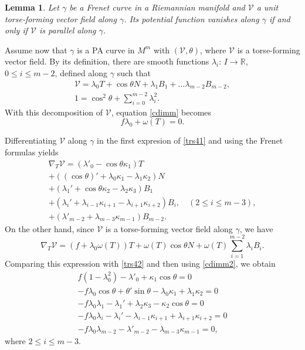 \documentclass[10pt,a4paper]{amsart}
\newtheorem{lemma}{Lemma}
\def\r{\mathbb R}
\def\v{\mathcal V}
\begin{document}
\begin{lemma}\label{consleng}
Let $\gamma $ be a Frenet curve in a Riemannian manifold and $\v$ a unit torse-forming vector field along $\gamma$. Its potential function vanishes along $\gamma$ if and only if $\v$ is parallel along $\gamma$.
\end{lemma}

Assume now that $\gamma$ is a PA curve in $M^m$ with $(\v,\theta)$, where $\v$ is a torse-forming vector field. By its definition, there are smooth functions $\lambda_i:\,I\to \r$, $0\leq i \leq m-2$, defined along $\gamma$ such that
\begin{equation}
\left. 
\begin{array}{l}
\v=\lambda_0 T+\cos\theta N+\lambda_1 B_1+\ldots \lambda_{m-2}B_{m-2}, \\ 
1=\cos^2\theta+\sum_{i=0}^{m-2}\lambda_i^2.
\end{array}%
\right. \label{trs41}
\end{equation}
With this decomposition of $\v$, equation \eqref{cdimm} becomes
\begin{equation}
f\lambda_0+\omega(T)=0. \label{cdimm2}
\end{equation}

Differentiating $\v$ along $\gamma$ in the first expresion of \eqref{trs41} and using the Frenet formulas yields
\begin{equation}
\left. 
\begin{array}{l}
\nabla_T\v= (\lambda'_0-\cos\theta \kappa_1)T\\
+((\cos \theta)'+\lambda_0\kappa_1-\lambda_1\kappa_2)N \\
+(\lambda_1'+\cos\theta\kappa_2-\lambda_2\kappa_3)B_1\\
+(\lambda_i'+\lambda_{i-1}\kappa_{i+1}-\lambda_{i+1}\kappa_{i+2})B_i, \quad (2\leq i \leq m-3),\\
+(\lambda'_{m-2}+\lambda_{m-3}\kappa_{m-1})B_{m-2} .
\end{array}%
\right. \label{trs42}
\end{equation}
On the other hand, since $\v$ is a torse-forming vector field along $\gamma$, we have
$$
\nabla_T\v=(f+\lambda_0\omega(T))T+\omega(T)\cos\theta N+\omega(T)\sum_{i=1}^{m-2}\lambda_iB_{i}.
$$
Comparing this expression with \eqref{trs42} and then using \eqref{cdimm2}, we obtain
\begin{equation}
\left. 
\begin{array}{r}
f(1-\lambda_0^2)-\lambda'_0+ \kappa_1\cos\theta=0\\
-f\lambda_0\cos\theta+\theta'\sin \theta-\lambda_0\kappa_1+\lambda_1\kappa_2=0 \\
-f\lambda_0\lambda_1-\lambda_1'+\lambda_2\kappa_3-\kappa_2\cos\theta=0\\
-f\lambda_0\lambda_i-\lambda_i'-\lambda_{i-1}\kappa_{i+1}+\lambda_{i+1}\kappa_{i+2}=0 \\
-f\lambda_0\lambda_{m-2}-\lambda'_{m-2}-\lambda_{m-3}\kappa_{m-1}=0,
\end{array}%
\right. \label{trs43}
\end{equation}
where $2\leq i \leq m-3$.
\end{document}
